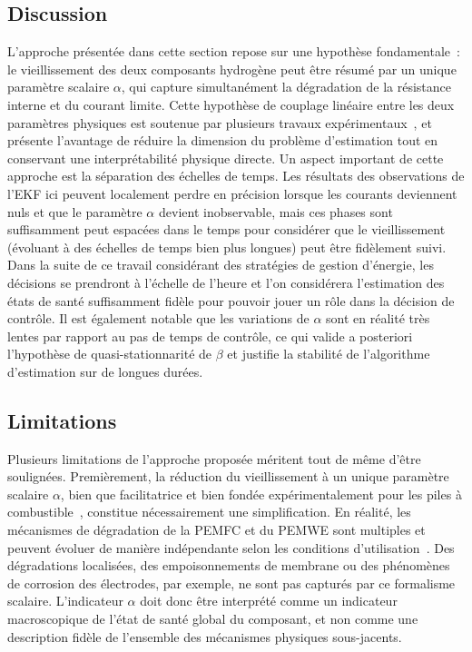 \subsection{Discussion}

L'approche présentée dans cette section repose sur une hypothèse fondamentale~: le vieillissement des deux composants hydrogène peut être résumé par un unique paramètre scalaire $\alpha$, qui capture simultanément la dégradation de la résistance interne et du courant limite. Cette hypothèse de couplage linéaire entre les deux paramètres physiques est soutenue par plusieurs travaux expérimentaux~\cite{bressel_extended_2016}\cite{foniok_mechanisms_2025}, et présente l'avantage de réduire la dimension du problème d'estimation tout en conservant une interprétabilité physique directe.
Un aspect important de cette approche est la séparation des échelles de temps. Les résultats des observations de l'EKF ici peuvent localement perdre en précision lorsque les courants deviennent nuls et que le paramètre $\alpha$ devient inobservable, mais ces phases sont suffisamment peut espacées dans le temps pour considérer que le vieillissement (évoluant à des échelles de temps bien plus longues) peut être fidèlement suivi. Dans la suite de ce travail considérant des stratégies de gestion d'énergie, les décisions se prendront à l'échelle de l'heure et l'on considérera l'estimation des états de santé suffisamment fidèle pour pouvoir jouer un rôle dans la décision de contrôle. Il est également notable que les variations de $\alpha$ sont en réalité très lentes par rapport au pas de temps de contrôle, ce qui valide a posteriori l'hypothèse de quasi-stationnarité de $\beta$ et justifie la stabilité de l'algorithme d'estimation sur de longues durées.

\subsection{Limitations}

Plusieurs limitations de l'approche proposée méritent tout de même d'être soulignées. Premièrement, la réduction du vieillissement à un unique paramètre scalaire $\alpha$, bien que facilitatrice et bien fondée expérimentalement pour les piles à combustible~\cite{bressel_extended_2016}, constitue nécessairement une simplification. En réalité, les mécanismes de dégradation de la PEMFC et du PEMWE sont multiples et peuvent évoluer de manière indépendante selon les conditions d'utilisation~\cite{foniok_mechanisms_2025}\cite{endrodi_challenges_2025}. Des dégradations localisées, des empoisonnements de membrane ou des phénomènes de corrosion des électrodes, par exemple, ne sont pas capturés par ce formalisme scalaire. L'indicateur $\alpha$ doit donc être interprété comme un indicateur macroscopique de l'état de santé global du composant, et non comme une description fidèle de l'ensemble des mécanismes physiques sous-jacents.

